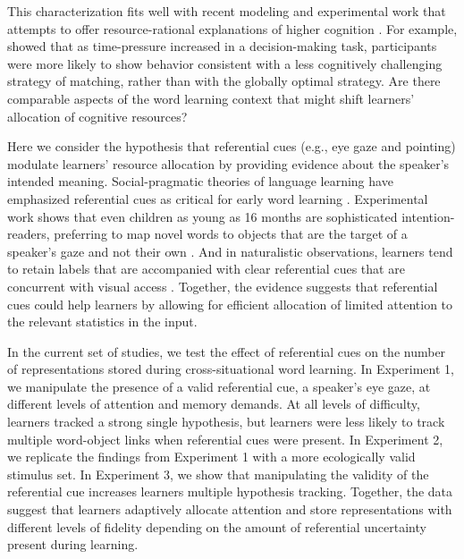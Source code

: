 \documentclass[10pt,letterpaper]{article}
\begin{document}
This characterization fits well with recent modeling and experimental work that attempts to offer resource-rational explanations of higher cognition \cite{griffiths2014rational}. For example,  showed that as time-pressure increased in a decision-making task, participants were more likely to show behavior consistent with a less cognitively challenging strategy of matching, rather than with the globally optimal strategy. Are there comparable aspects of the word learning context that might shift learners' allocation of cognitive resources?

Here we consider the hypothesis that referential cues (e.g., eye gaze and pointing) modulate learners' resource allocation by providing evidence about the speaker's intended meaning. Social-pragmatic theories of language learning have emphasized referential cues as critical for early word learning  \cite{bloom2002children, clark2009first}. Experimental work shows that even children as young as 16 months are sophisticated intention-readers, preferring to map novel words to objects that are the target of a speaker's gaze and not their own \cite{baldwin1993infants}. And in naturalistic observations, learners tend to retain labels that are accompanied with clear referential cues that are concurrent with visual access \cite{yu2012embodied}. Together, the evidence suggests that referential cues could help learners by allowing for efficient allocation of limited attention to the relevant statistics in the input.

In the current set of studies, we test the effect of referential cues on the number of representations stored during cross-situational word learning. In Experiment 1, we manipulate the presence of a valid referential cue, a speaker's eye gaze, at different levels of attention and memory demands. At all levels of difficulty, learners tracked a strong single hypothesis, but learners were less likely to track multiple word-object links when referential cues were present. In Experiment 2, we replicate the findings from Experiment 1 with a more ecologically valid stimulus set. In Experiment 3, we show that manipulating the validity of the referential cue increases learners multiple hypothesis tracking. Together, the data suggest that learners adaptively allocate attention and store representations with different levels of fidelity depending on the amount of referential uncertainty present during learning.	

\end{document}
